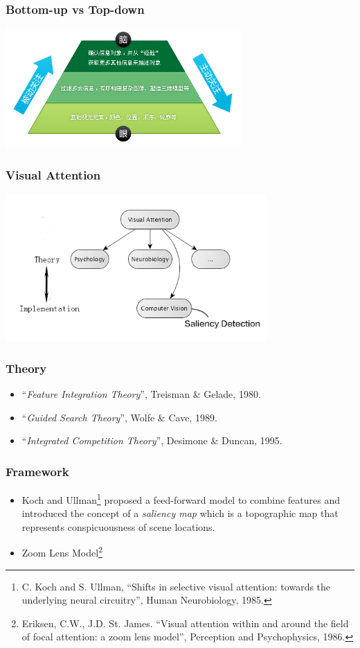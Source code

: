 \documentclass[notheorems,serif,table,compress]{beamer}  %
\begin{document}
\begin{frame}
\frametitle{Bottom-up vs Top-down}
\centering\includegraphics[width=9cm]{BottomupTopdown.png}
\end{frame}


\begin{frame}
\frametitle{Visual Attention}
\centering\includegraphics[width=10cm]{fields.png}
\end{frame}


\begin{frame}
\frametitle{Theory}
\begin{itemize}
\item ``{\color{blue}\emph{Feature Integration Theory}}'', Treisman \& Gelade, 1980.
\item ``{\color{blue}\emph{Guided Search Theory}}'', Wolfe \& Cave, 1989.
\item ``{\color{blue}\emph{Integrated Competition Theory}}'', Desimone \& Duncan, 1995.
\end{itemize}
\end{frame}


\begin{frame}
\frametitle{Framework}
\begin{itemize}
\item Koch and Ullman\footnote{C. Koch and S. Ullman, ``Shifts in selective visual attention: towards the underlying neural circuitry'', Human Neurobiology, 1985.} proposed a feed-forward model to combine features and introduced the concept of a {\color{blue}\emph{saliency map}} which is a topographic map that represents conspicuousness of scene locations.
\item Zoom Lens Model\footnote{Eriksen, C.W., J.D. St. James. ``Visual attention within and around the field of focal attention: a zoom lens model'', Perception and Psychophysics, 1986.}
\end{itemize}
\end{frame}
\end{document}
